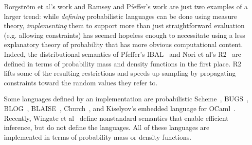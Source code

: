 \documentclass{llncs}
\begin{document}
Borgstr\"om et al's work and Ramsey and Pfeffer's work are just two examples of a larger trend: while \emph{defining} probabilistic languages can be done using measure theory, \emph{implementing} them to support more than just straightforward evaluation (e.g. allowing constraints) has seemed hopeless enough to necessitate using a less explanatory theory of probability that has more obvious computational content.
Indeed, the distributional semantics of Pfeffer's IBAL~\cite{cit:pfeffer-2007chapter-ibal} and Nori et al's R2~\cite{cit:nori-2014aaai-preimage} are defined in terms of probability mass and density functions in the first place.
R2 lifts some of the resulting restrictions and speeds up sampling by propagating constraints toward the random values they refer to.

Some languages defined by an implementation are probabilistic Scheme~\cite{cit:koller-1997aaai-bayes-programs-short}, BUGS~\cite{cit:winbugs-language-short}, BLOG~\cite{cit:blog-language-short}, BLAISE~\cite{cit:blaise-language}, Church~\cite{cit:church-language-short}, and Kiselyov's embedded language for OCaml~\cite{cit:kiselyov-2008uai-monolingual}.
Recently, Wingate et al~\cite{cit:wingate-2011nips-nonstandard} define nonstandard semantics that enable efficient inference, but do not define the languages.
All of these languages are implemented in terms of probability mass or density functions.
\end{document}
